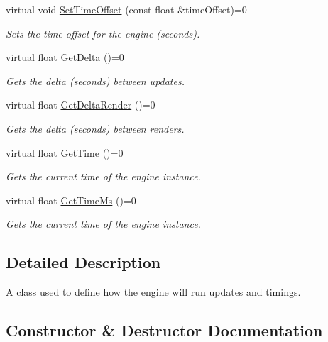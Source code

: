 \begin{DoxyCompactItemize}
virtual void \hyperlink{class_flounder_1_1_i_updater_a810d7c8481aacd2a1061f540683c3beb}{Set\+Time\+Offset} (const float \&time\+Offset)=0
\begin{DoxyCompactList}\small\item\em Sets the time offset for the engine (seconds). \end{DoxyCompactList}\item 
virtual float \hyperlink{class_flounder_1_1_i_updater_ac04f99c728fadd46ecaa219b2be358dc}{Get\+Delta} ()=0
\begin{DoxyCompactList}\small\item\em Gets the delta (seconds) between updates. \end{DoxyCompactList}\item 
virtual float \hyperlink{class_flounder_1_1_i_updater_a62aed4c31b475fa7afc3a4d9863dca98}{Get\+Delta\+Render} ()=0
\begin{DoxyCompactList}\small\item\em Gets the delta (seconds) between renders. \end{DoxyCompactList}\item 
virtual float \hyperlink{class_flounder_1_1_i_updater_a2a3f3c2a0308eea36414d51242206a3e}{Get\+Time} ()=0
\begin{DoxyCompactList}\small\item\em Gets the current time of the engine instance. \end{DoxyCompactList}\item 
virtual float \hyperlink{class_flounder_1_1_i_updater_a0eb42ac0880b7aedca1de356a677d197}{Get\+Time\+Ms} ()=0
\begin{DoxyCompactList}\small\item\em Gets the current time of the engine instance. \end{DoxyCompactList}\end{DoxyCompactItemize}


\subsection{Detailed Description}
A class used to define how the engine will run updates and timings. 



\subsection{Constructor \& Destructor Documentation}
\mbox{\label{class_flounder_1_1_i_updater_ab07ce766ae1ec647c853fb136671e2c7}} 
